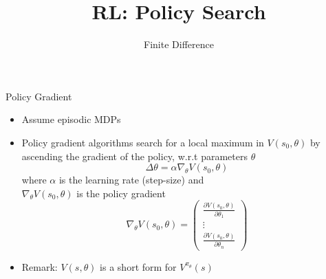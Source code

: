 \documentclass[aspectratio=169]{../latex_main/tntbeamer}  %
\title[RL: Finite Difference]{RL: Policy Search}
\subtitle{Finite Difference}
\begin{document}
	
	\maketitle

\begin{frame}[c]{Policy Gradient}

\begin{itemize}
	\item Assume episodic MDPs 
	\item Policy gradient algorithms search for a \alert{local} maximum in $V(s_0,\theta)$ by ascending the gradient of the policy, w.r.t parameters $\theta$
	$$\Delta \theta = \alpha \nabla_\theta V(s_0, \theta) $$
	where $\alpha$ is the learning rate (step-size) and\\ $\nabla_\theta V(s_0, \theta)$ is the policy gradient
		$$\nabla_\theta V(s_0, \theta) = \begin{pmatrix}
	\frac{\partial V(s_0, \theta)}{\partial \theta_1}\\
	\vdots\\
	\frac{\partial V(s_0, \theta)}{\partial \theta_n}
	\end{pmatrix} $$
	\medskip
	\item Remark: $V(s,\theta)$ is a short form for $V^{\pi_{\theta}}(s)$ 
\end{itemize}

\end{frame}
\end{document}
